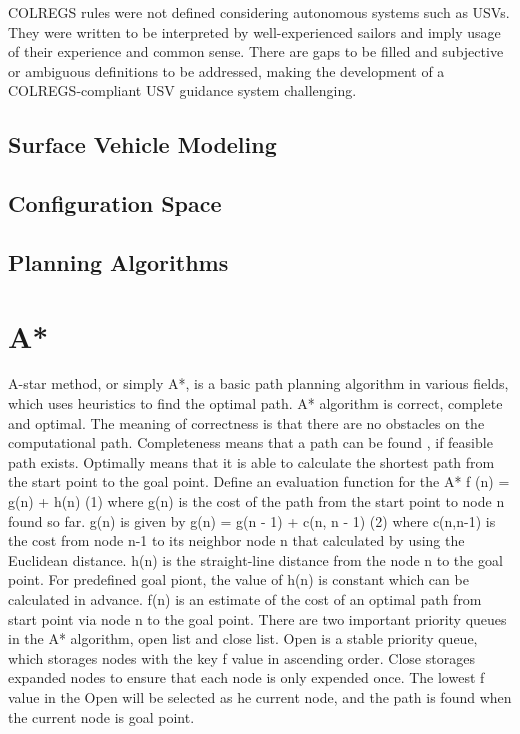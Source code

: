     \ac{COLREGS} rules were not defined considering autonomous systems such as \ac{USV}s. They were written to be interpreted by well-experienced sailors and imply usage of their experience and common sense. There are gaps to be filled and subjective or ambiguous definitions to be addressed, making the development of a \ac{COLREGS}-compliant \ac{USV} guidance system challenging.

    \subsection{Surface Vehicle Modeling}
    \subsection{Configuration Space}
    \subsection{Planning Algorithms}
    
\section{A*}

A-star method, or simply A*, is a basic path planning algorithm in various fields, which uses heuristics to find the optimal path. A* algorithm is correct, complete and optimal. The meaning of correctness is that there are no obstacles on the computational path. Completeness means that a path can be found , if feasible path exists. Optimally means that it is able to calculate the shortest path from the start point to the goal point.
Define an evaluation function for the A*
f (n) = g(n) + h(n) (1)
where
 g(n) is the cost of the path from the start point to node
n found so far. g(n) is given by
g(n) = g(n - 1) + c(n, n - 1) (2)
where c(n,n-1) is the cost from node n-1 to its neighbor node n that calculated by using the Euclidean distance.
 h(n) is the straight-line distance from the node n to the goal point. For predefined goal piont, the value of h(n) is constant which can be calculated in advance.
 f(n) is an estimate of the cost of an optimal path from start point via node n to the goal point.
There are two important priority queues in the A* algorithm, open list and close list. Open is a stable priority queue, which storages nodes with the key f value in ascending order. Close storages expanded nodes to ensure that each node is only expended once. The lowest f value in the Open will be selected as he current node, and the path is found when the current node is goal point. \cite{Wang2018Hybrid}


